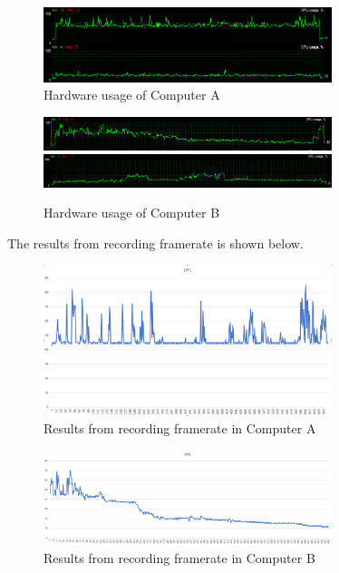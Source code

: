 \begin{figure}[H]
\centering
\includegraphics[width=0.75\textwidth]{InternalTest/B_usage.PNG}
\caption{Hardware usage of Computer A}
\end{figure}

\begin{figure}[H]
\centering
\includegraphics[width=0.75\textwidth]{InternalTest/C_gpu.PNG}
\includegraphics[width=0.75\textwidth]{InternalTest/C_cpu.PNG}
\caption{Hardware usage of Computer B}
\end{figure}

The results from recording framerate is shown below.

\begin{figure}[H]
\centering
\includegraphics[width=0.75\textwidth]{InternalTest/A_fps.PNG}
\caption{Results from recording framerate in Computer A}
\end{figure}

\begin{figure}[H]
\centering
\includegraphics[width=0.75\textwidth]{InternalTest/B_fps.PNG}
\caption{Results from recording framerate in Computer B}
\end{figure}


